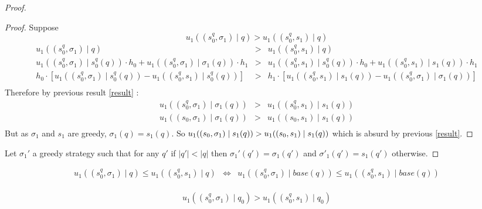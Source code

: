 \begin{proof}
\begin{proof}
Suppose  $$u_1((s^{q}_0,\sigma_1) \mid q) >  u_1((s^{q}_0,s_1) \mid q)$$
\begin{eqnarray*}
	u_1((s^{q}_0,\sigma_1) \mid q) & > & u_1((s^{q}_0,s_1) \mid q) \\ 
	u_1((s^{q}_0,\sigma_1) \mid s^{q}_0(q))\cdot h_0 + u_1((s^{q}_0,\sigma_1) \mid \sigma_1(q))\cdot h_1&  > & u_1((s^{q}_0,s_1) \mid s^{q}_0(q))\cdot h_0 + u_1((s^{q}_0,s_1) \mid s_1(q))\cdot h_1 \\
	h_0\cdot [u_1((s^{q}_0,\sigma_1) \mid s^{q}_0(q)) - u_1((s^{q}_0,s_1) \mid s^{q}_0(q)) ] &  > & h_1 \cdot  [u_1((s^{q}_0,s_1) \mid s_1(q))- u_1((s^{q}_0,\sigma_1) \mid \sigma_1(q)) ] \\
\end{eqnarray*}
Therefore by previous result \ref{result} : 
\begin{eqnarray*}
	u_1((s^{q}_0,\sigma_1) \mid \sigma_1(q)) &  > & u_1((s^{q}_0,s_1) \mid s_1(q)) \\
	u_1((s_0,\sigma_1) \mid \sigma_1(q)) &  > & u_1((s_0,s_1) \mid s_1(q)) \\
\end{eqnarray*}
But as $\sigma_1$ and $s_1$ are greedy, $\sigma_1(q) = s_1(q)$.
So $ u_1((s_0,\sigma_1) \mid s_1(q))  >  u_1((s_0,s_1) \mid s_1(q)) \\ $ which is absurd by previous  \ref{result}.
\end{proof}
Let $\sigma_1'$ a greedy strategy such that for any $q'$  if  $|q'| < |q|$ then $\sigma_1'(q') = \sigma_1(q')$ and $\sigma'_1(q') = s_1(q') $ otherwise.


\end{proof}


\begin{eqnarray*}
	u_1((s^{q}_0,\sigma_1) \mid q) \leq  u_1((s^{q}_0,s_1) \mid q) & \Leftrightarrow & u_1((s^{q}_0,\sigma_1) \mid base(q)) \leq  u_1((s^{q}_0,s_1) \mid base(q)) \\
\end{eqnarray*}

$$u_1((s^{q}_0,\sigma_1) \mid q_0) >  u_1((s^{q}_0,s_1) \mid q_0)$$


